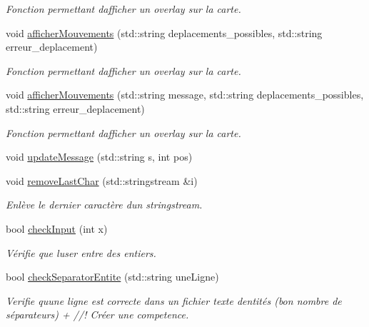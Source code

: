 \begin{DoxyCompactItemize}
\begin{DoxyCompactList}\small\item\em Fonction permettant d\textquotesingle{}afficher un overlay sur la carte. \end{DoxyCompactList}\item 
void \hyperlink{namespaceio_ac0728fb89b032a7b33641e0d2c34cc28}{afficher\+Mouvements} (std\+::string deplacements\+\_\+possibles, std\+::string erreur\+\_\+deplacement)
\begin{DoxyCompactList}\small\item\em Fonction permettant d\textquotesingle{}afficher un overlay sur la carte. \end{DoxyCompactList}\item 
void \hyperlink{namespaceio_a312765b285c5f20dfe113609c86b8fdd}{afficher\+Mouvements} (std\+::string message, std\+::string deplacements\+\_\+possibles, std\+::string erreur\+\_\+deplacement)
\begin{DoxyCompactList}\small\item\em Fonction permettant d\textquotesingle{}afficher un overlay sur la carte. \end{DoxyCompactList}\item 
void \hyperlink{namespaceio_a61739b6fe40275cdb72215fd08f41d87}{update\+Message} (std\+::string s, int pos)
\item 
void \hyperlink{namespaceio_a0ed486192687092d372440a79c3a65a3}{remove\+Last\+Char} (std\+::stringstream \&i)
\begin{DoxyCompactList}\small\item\em Enlève le dernier caractère d\textquotesingle{}un stringstream. \end{DoxyCompactList}\item 
bool \hyperlink{namespaceio_ac79ddb3191a9d00d007eb48deb315942}{check\+Input} (int x)
\begin{DoxyCompactList}\small\item\em Vérifie que l\textquotesingle{}user entre des entiers. \end{DoxyCompactList}\item 
bool \hyperlink{namespaceio_a993e82931eec7bf1db5110871c03c2d1}{check\+Separator\+Entite} (std\+::string une\+Ligne)
\begin{DoxyCompactList}\small\item\em Verifie qu\textquotesingle{}une ligne est correcte dans un fichier texte d\textquotesingle{}entités (bon nombre de séparateurs) + //! Créer une competence. \end{DoxyCompactList}\item 

\end{DoxyCompactItemize}
